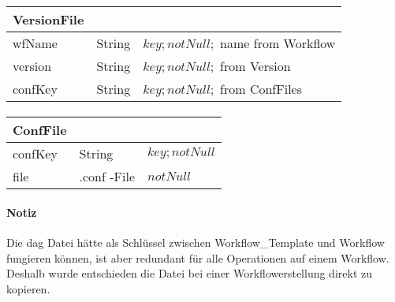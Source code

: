\paragraph{}
\begin{tabular}{|p{4cm}|p{2cm}|p{6cm}|}
	\hline
	\textbf{VersionFile} & & \\
	\hline
	wfName & String & $key; notNull;$ name from Workflow\\
	\hline
	version & String & $key; notNull;$ from Version \\
	\hline
	confKey & String & $key; notNull;$ from ConfFiles \\
	\hline
\end{tabular}

\paragraph{}
\begin{tabular}{|p{4cm}|p{2cm}|p{6cm}|}
	\hline
	\textbf{ConfFile} & & \\
	\hline
	confKey & String & $key; notNull$ \\
	\hline
	file & .conf -File & $notNull$ \\
	\hline
\end{tabular}

\paragraph{Notiz} Die dag Datei hätte als Schlüssel zwischen Workflow\_Template und Workflow fungieren können, ist aber redundant für alle Operationen auf einem Workflow.
Deshalb wurde entschieden die Datei bei einer Workflowerstellung direkt zu kopieren.



\newpage